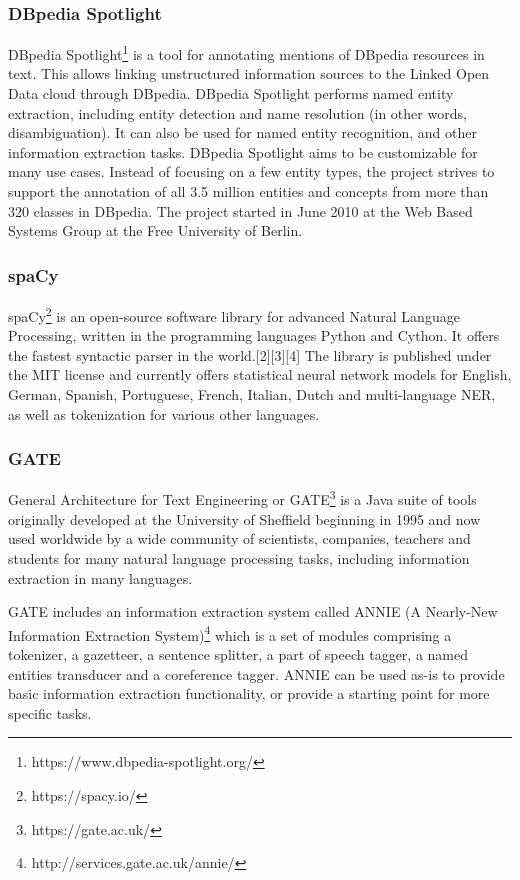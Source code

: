 \documentclass[thesis=M,english]{FITthesis}[2018/05/30]
\begin{document}
\subsubsection{DBpedia Spotlight}\label{DBpedia Spotlight}
DBpedia Spotlight\footnote{https://www.dbpedia-spotlight.org/}  \cite{wiki:DBpediaSpotlight} is a tool for annotating mentions of DBpedia resources in text. This allows linking unstructured information sources to the Linked Open Data cloud through DBpedia. DBpedia Spotlight performs named entity extraction, including entity detection and name resolution (in other words, disambiguation). It can also be used for named entity recognition, and other information extraction tasks. DBpedia Spotlight aims to be customizable for many use cases. Instead of focusing on a few entity types, the project strives to support the annotation of all 3.5 million entities and concepts from more than 320 classes in DBpedia. The project started in June 2010 at the Web Based Systems Group at the Free University of Berlin.

\subsubsection{spaCy}\label{spaCy}
spaCy\footnote{https://spacy.io/} \cite{wiki:spaCy} is an open-source software library for advanced Natural Language Processing, written in the programming languages Python and Cython. It offers the fastest syntactic parser in the world.[2][3][4] The library is published under the MIT license and currently offers statistical neural network models for English, German, Spanish, Portuguese, French, Italian, Dutch and multi-language NER, as well as tokenization for various other languages.

\subsubsection{GATE}\label{GATE}
General Architecture for Text Engineering or GATE\footnote{https://gate.ac.uk/} \cite{wiki:GATE} is a Java suite of tools originally developed at the University of Sheffield beginning in 1995 and now used worldwide by a wide community of scientists, companies, teachers and students for many natural language processing tasks, including information extraction in many languages.

GATE includes an information extraction system called ANNIE (A Nearly-New Information Extraction System)\footnote{http://services.gate.ac.uk/annie/} which is a set of modules comprising a tokenizer, a gazetteer, a sentence splitter, a part of speech tagger, a named entities transducer and a coreference tagger. ANNIE can be used as-is to provide basic information extraction functionality, or provide a starting point for more specific tasks.
\end{document}

